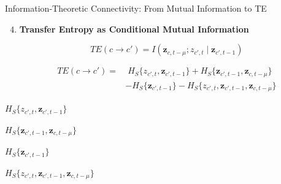 \documentclass[aspectratio=169]{beamer}
\let\oldcite\cite
\renewcommand{\cite}[1]{{\tiny\oldcite{#1}}}
\providecommand{\ve}[1]{{\bm{#1}}}
\begin{document}
\begin{frame}{Information-Theoretic Connectivity: From Mutual Information to TE}

\scriptsize
\setlength{\abovedisplayskip}{2pt}
\setlength{\belowdisplayskip}{2pt}
\setlength{\jot}{2pt}

\begin{enumerate}
\setcounter{enumi}{3}

\item \textbf{Transfer Entropy as Conditional Mutual Information}
{\scriptsize \cite{schreiber2000measuring}}

\[
TE(c\rightarrow c')
=
I\left(
\ve{z}_{c,t-\mu};
z_{c',t}
\mid
\ve{z}_{c',t-1}
\right)
\]

\vspace{0.04cm}

\[
\begin{aligned}
TE(c\rightarrow c')
=&\;
H_S\{z_{c',t},\ve{z}_{c',t-1}\}
+
H_S\{\ve{z}_{c',t-1},\ve{z}_{c,t-\mu}\}\\
&-
H_S\{\ve{z}_{c',t-1}\}
-
H_S\{z_{c',t},\ve{z}_{c',t-1},\ve{z}_{c,t-\mu}\}
\end{aligned}
\]

\end{enumerate}

\vspace{0.10cm}

\begin{center}
\begin{minipage}{0.18\textwidth}
\centering
\resizebox{1.45cm}{!}{}

{\tiny
$H_S\{z_{c',t},\ve{z}_{c',t-1}\}$
}
\end{minipage}
\hfill
\begin{minipage}{0.18\textwidth}
\centering
\resizebox{1.45cm}{!}{}

{\tiny
$H_S\{\ve{z}_{c',t-1},\ve{z}_{c,t-\mu}\}$
}
\end{minipage}
\hfill
\begin{minipage}{0.18\textwidth}
\centering
\resizebox{1.45cm}{!}{}

{\tiny
$H_S\{\ve{z}_{c',t-1}\}$
}
\end{minipage}
\hfill
\begin{minipage}{0.18\textwidth}
\centering
\resizebox{1.45cm}{!}{}

{\tiny
$H_S\{z_{c',t},\ve{z}_{c',t-1},\ve{z}_{c,t-\mu}\}$
}
\end{minipage}
\hfill
\begin{minipage}{0.18\textwidth}
\centering
\resizebox{1.45cm}{!}{}


\end{minipage}
\end{center}
\end{frame}
\end{document}

